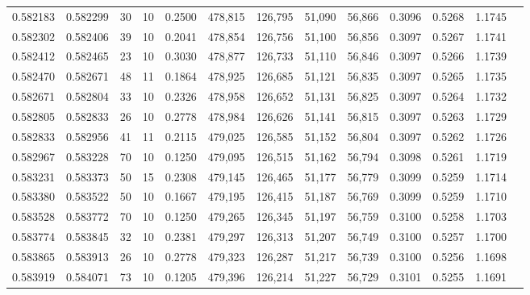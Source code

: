 \begin{tabular}{rrrrrrrrrrrrr}
0.582183 & 0.582299 &    30 &  10 &                                     0.2500 & 478,815 & 126,795 &  51,090 &  56,866 & 0.3096 & 0.5268 & 1.1745 \\
0.582302 & 0.582406 &    39 &  10 &                                     0.2041 & 478,854 & 126,756 &  51,100 &  56,856 & 0.3097 & 0.5267 & 1.1741 \\
0.582412 & 0.582465 &    23 &  10 &                                     0.3030 & 478,877 & 126,733 &  51,110 &  56,846 & 0.3097 & 0.5266 & 1.1739 \\
0.582470 & 0.582671 &    48 &  11 &                                     0.1864 & 478,925 & 126,685 &  51,121 &  56,835 & 0.3097 & 0.5265 & 1.1735 \\
0.582671 & 0.582804 &    33 &  10 &                                     0.2326 & 478,958 & 126,652 &  51,131 &  56,825 & 0.3097 & 0.5264 & 1.1732 \\
0.582805 & 0.582833 &    26 &  10 &                                     0.2778 & 478,984 & 126,626 &  51,141 &  56,815 & 0.3097 & 0.5263 & 1.1729 \\
0.582833 & 0.582956 &    41 &  11 &                                     0.2115 & 479,025 & 126,585 &  51,152 &  56,804 & 0.3097 & 0.5262 & 1.1726 \\
0.582967 & 0.583228 &    70 &  10 &                                     0.1250 & 479,095 & 126,515 &  51,162 &  56,794 & 0.3098 & 0.5261 & 1.1719 \\
0.583231 & 0.583373 &    50 &  15 &                                     0.2308 & 479,145 & 126,465 &  51,177 &  56,779 & 0.3099 & 0.5259 & 1.1714 \\
0.583380 & 0.583522 &    50 &  10 &                                     0.1667 & 479,195 & 126,415 &  51,187 &  56,769 & 0.3099 & 0.5259 & 1.1710 \\
0.583528 & 0.583772 &    70 &  10 &                                     0.1250 & 479,265 & 126,345 &  51,197 &  56,759 & 0.3100 & 0.5258 & 1.1703 \\
0.583774 & 0.583845 &    32 &  10 &                                     0.2381 & 479,297 & 126,313 &  51,207 &  56,749 & 0.3100 & 0.5257 & 1.1700 \\
0.583865 & 0.583913 &    26 &  10 &                                     0.2778 & 479,323 & 126,287 &  51,217 &  56,739 & 0.3100 & 0.5256 & 1.1698 \\
0.583919 & 0.584071 &    73 &  10 &                                     0.1205 & 479,396 & 126,214 &  51,227 &  56,729 & 0.3101 & 0.5255 & 1.1691 \\

\end{tabular}
